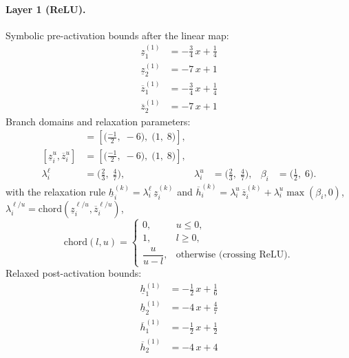 \documentclass[11pt]{article}
\begin{document}
\paragraph{Layer 1 (ReLU).}
Symbolic pre-activation bounds after the linear map:
\begin{align*}
\underline{z}^{(1)}_{1} &= -\frac{3}{4}\,x + \frac{1}{4} \\
\underline{z}^{(1)}_{2} &= -7\,x + 1
\end{align*}
\begin{align*}
\overline{z}^{(1)}_{1} &= -\frac{3}{4}\,x + \frac{1}{4} \\
\overline{z}^{(1)}_{2} &= -7\,x + 1
\end{align*}
Branch domains and relaxation parameters:
\begin{align*}
[\underline{z}^{\ell}_i, \overline{z}^{\ell}_i] &= [\bigl(\frac{-1}{2},\; -6\bigr),\; \bigl(1,\; 8\bigr)], \\ 
[\underline{z}^{u}_i, \overline{z}^{u}_i] &= [\bigl(\frac{-1}{2},\; -6\bigr),\; \bigl(1,\; 8\bigr)], \\
\lambda^{\ell}_i &= \bigl(\frac{2}{3},\; \frac{4}{7}\bigr), & \lambda^{u}_i &= \bigl(\frac{2}{3},\; \frac{4}{7}\bigr), & \beta_i &= \bigl(\frac{1}{2},\; 6\bigr).
\end{align*}
with the relaxation rule
$\underline{h}^{(k)}_i = \lambda^{\ell}_i\, \underline{z}^{(k)}_i$ and
$\overline{h}^{(k)}_i = \lambda^{u}_i\, \overline{z}^{(k)}_i + \lambda^{u}_i \max(\beta_i, 0)$,
$\lambda^{\ell/u}_i = \mathrm{chord}(\underline{z}_i^{\ell/u}, \overline{z}_i^{\ell/u})$,
\[
\mathrm{chord}(l, u) =
\begin{cases}
0, & u \le 0,\\
1, & l \ge 0,\\
\dfrac{u}{u - l}, & \text{otherwise (crossing ReLU)}.
\end{cases}\]
Relaxed post-activation bounds:
\begin{align*}
\underline{h}^{(1)}_{1} &= -\frac{1}{2}\,x + \frac{1}{6} \\
\underline{h}^{(1)}_{2} &= -4\,x + \frac{4}{7}
\end{align*}
\begin{align*}
\overline{h}^{(1)}_{1} &= -\frac{1}{2}\,x + \frac{1}{2} \\
\overline{h}^{(1)}_{2} &= -4\,x + 4
\end{align*}
\end{document}
